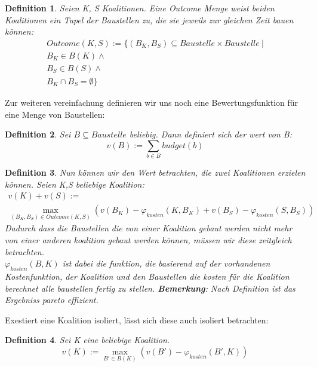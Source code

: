 \documentclass[12pt]{article}
\theoremstyle{break}
\newtheorem{definition}{Definition}
\begin{document}
\begin{definition}
  Seien K, S Koalitionen. Eine Outcome Menge weist beiden Koalitionen ein Tupel der Baustellen zu, die sie jeweils zur gleichen Zeit bauen können:
\begin{eqnarray}
  Outcome(K,S) := \{(B_K,B_S)\subseteq Baustelle\times Baustelle\ |\\B_K\in B(K) \land \\ B_S\in B(S)\land\\B_K\cap B_S =\emptyset \}
\end{eqnarray}
\end{definition}

Zur weiteren vereinfachung definieren wir uns noch eine Bewertungsfunktion für eine Menge von Baustellen:


\begin{definition}
  Sei $B\subseteq Baustelle$ beliebig. Dann definiert sich der wert von B:
  \begin{equation}
    v(B):=\sum_{b\in B} budget(b)
  \end{equation}
\end{definition}


\begin{definition}
  Nun können wir den Wert betrachten, die zwei Koalitionen erzielen können. Seien K,S beliebige Koalition:
\begin{eqnarray}
  v(K) + v(S) := \\\max_{(B_K, B_S)\in Outcome(K,S)}(v(B_K) - \varphi_{kosten}(K, B_K) + v(B_S) - \varphi_{kosten}(S, B_S))
\end{eqnarray}
Dadurch dass die Baustellen die von einer Koalition gebaut werden nicht mehr von einer anderen koalition gebaut werden können, müssen wir diese zeitgleich betrachten.\\
$\varphi_{kosten}(B,K)$ ist dabei die funktion, die basierend auf der vorhandenen Kostenfunktion, der Koalition und den Baustellen die kosten für die Koalition berechnet alle baustellen fertig zu stellen.
\textbf{Bemerkung}: Nach Definition ist das Ergebniss pareto effizient.
\end{definition}

Exestiert eine Koalition isoliert, lässt sich diese auch isoliert betrachten:
\begin{definition}
  Sei K eine beliebige Koalition.
  \begin{equation}
    v(K) := \max_{B'\in B(K)}(v(B') - \varphi_{kosten}(B', K))
  \end{equation}
\end{definition}
\end{document}
